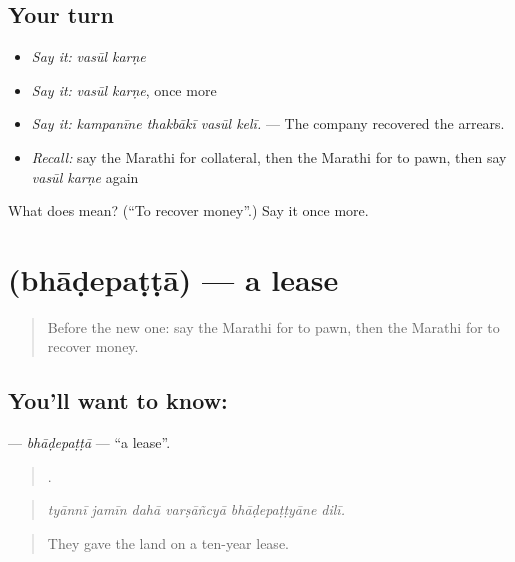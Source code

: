 \subsection*{Your turn}
\begin{itemize}
\raggedright
  \item \emph{Say it:} \emph{vasūl karṇe}
  \item \emph{Say it:} \emph{vasūl karṇe}, once more
  \item \emph{Say it:} \emph{kampanīne thakbākī vasūl kelī.} — The company recovered the arrears.
  \item \emph{Recall:} say the Marathi for collateral, then the Marathi for to pawn, then say \emph{vasūl karṇe} again
\end{itemize}

\begin{tcolorbox}[breakable,colback=teal!4,colframe=teal!35!black,title={Before you move on}]
What does   mean? (\textquotedblleft{}To recover money\textquotedblright{}.) Say it once more.
\end{tcolorbox}
\section[\texorpdfstring{\mr{भाडेपट्टा} (bhāḍepaṭṭā)}{भाडेपट्टा (bhāḍepaṭṭā)}]{ (bhāḍepaṭṭā) — a lease}

\label{lesson:MR-C429-bhadepatta}



\begin{quote}
Before the new one: say the Marathi for to pawn, then the Marathi for to recover money.
\end{quote}

\subsection*{You'll want to know: }
\textbf{} — \emph{bhāḍepaṭṭā} — \textquotedblleft{}a lease\textquotedblright{}.

\begin{quote}
     .
\end{quote}

\begin{quote}
\emph{tyānnī jamīn dahā varṣāñcyā bhāḍepaṭṭyāne dilī.}
\end{quote}

\begin{quote}
They gave the land on a ten-year lease.
\end{quote}

